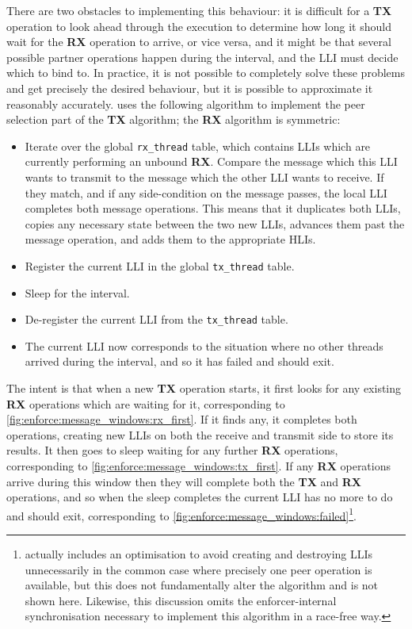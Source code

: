 There are two obstacles to implementing this behaviour: it is
difficult for a \textbf{TX} operation to look ahead through the
execution to determine how long it should wait for the \textbf{RX}
operation to arrive, or vice versa, and it might be that several
possible partner operations happen during the interval, and the LLI
must decide which to bind to.  In practice, it is not possible to
completely solve these problems and get precisely the desired
behaviour, but it is possible to approximate it reasonably accurately.
{\Implementation} uses the following algorithm to implement the peer
selection part of the \textbf{TX} algorithm; the \textbf{RX} algorithm
is symmetric:
\begin{itemize}
\item[1] Iterate over the global \texttt{rx\_thread} table, which
  contains LLIs which are currently performing an unbound \textbf{RX}.
  Compare the message which this LLI wants to transmit to the message
  which the other LLI wants to receive.  If they match, and if any
  side-condition on the message passes, the local LLI completes both
  message operations.  This means that it duplicates both LLIs, copies
  any necessary state between the two new LLIs, advances them past the
  message operation, and adds them to the appropriate HLIs.
\item[2] Register the current LLI in the global \texttt{tx\_thread}
  table.
\item[3] Sleep for the interval.
\item[4] De-register the current LLI from the \texttt{tx\_thread}
  table.
\item[5] The current LLI now corresponds to the situation where no
  other threads arrived during the interval, and so it has failed and
  should exit.
\end{itemize}
The intent is that when a new \textbf{TX} operation starts, it first
looks for any existing \textbf{RX} operations which are waiting for
it, corresponding to \autoref{fig:enforce:message_windows:rx_first}.
If it finds any, it completes both operations, creating new LLIs on
both the receive and transmit side to store its results.  It then goes
to sleep waiting for any further \textbf{RX} operations, corresponding
to \autoref{fig:enforce:message_windows:tx_first}.  If any \textbf{RX}
operations arrive during this window then they will complete both the
\textbf{TX} and \textbf{RX} operations, and so when the sleep
completes the current LLI has no more to do and should exit,
corresponding to
\autoref{fig:enforce:message_windows:failed}\footnote{{\Implementation}
  actually includes an optimisation to avoid creating and destroying
  LLIs unnecessarily in the common case where precisely one peer
  operation is available, but this does not fundamentally alter the
  algorithm and is not shown here.  Likewise, this discussion omits
  the enforcer-internal synchronisation necessary to implement this
  algorithm in a race-free way.}.

